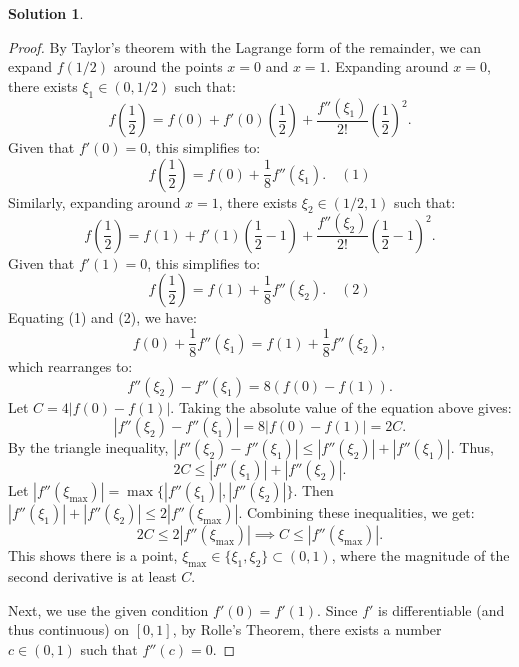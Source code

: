 \documentclass[12pt]{article}
\theoremstyle{definition}
\newtheorem*{solution}{\normalfont\textbf{Solution}}
\begin{document}
\begin{enumerate}[leftmargin=*]
\begin{solution}
\begin{proof}
            By Taylor's theorem with the Lagrange form of the remainder, we can expand \( f(1/2) \) around the points \( x=0 \) and \( x=1 \).
            Expanding around \( x=0 \), there exists \( \xi_1 \in (0, 1/2) \) such that:
            \[
            f\left(\frac{1}{2}\right) = f(0) + f'(0)\left(\frac{1}{2}\right) + \frac{f''(\xi_1)}{2!}\left(\frac{1}{2}\right)^2.
            \]
            Given that \( f'(0) = 0 \), this simplifies to:
            \[
            f\left(\frac{1}{2}\right) = f(0) + \frac{1}{8}f''(\xi_1). \quad (1)
            \]
            Similarly, expanding around \( x=1 \), there exists \( \xi_2 \in (1/2, 1) \) such that:
            \[
            f\left(\frac{1}{2}\right) = f(1) + f'(1)\left(\frac{1}{2} - 1\right) + \frac{f''(\xi_2)}{2!}\left(\frac{1}{2} - 1\right)^2.
            \]
            Given that \( f'(1) = 0 \), this simplifies to:
            \[
            f\left(\frac{1}{2}\right) = f(1) + \frac{1}{8}f''(\xi_2). \quad (2)
            \]
            Equating (1) and (2), we have:
            \[
            f(0) + \frac{1}{8}f''(\xi_1) = f(1) + \frac{1}{8}f''(\xi_2),
            \]
            which rearranges to:
            \[
            f''(\xi_2) - f''(\xi_1) = 8(f(0) - f(1)).
            \]
            Let \( C = 4|f(0) - f(1)| \). Taking the absolute value of the equation above gives:
            \[
            |f''(\xi_2) - f''(\xi_1)| = 8|f(0) - f(1)| = 2C.
            \]
            By the triangle inequality, \( |f''(\xi_2) - f''(\xi_1)| \le |f''(\xi_2)| + |f''(\xi_1)| \). Thus,
            \[
            2C \le |f''(\xi_1)| + |f''(\xi_2)|.
            \]
            Let \( |f''(\xi_{\text{max}})| = \max\{|f''(\xi_1)|, |f''(\xi_2)| \}\). Then \( |f''(\xi_1)| + |f''(\xi_2)| \le 2|f''(\xi_{\text{max}})| \). Combining these inequalities, we get:
            \[
            2C \le 2|f''(\xi_{\text{max}})| \implies C \le |f''(\xi_{\text{max}})|.
            \]
            This shows there is a point, \( \xi_{\text{max}} \in \{\xi_1, \xi_2\} \subset (0, 1) \), where the magnitude of the second derivative is at least \( C \).

            Next, we use the given condition \( f'(0) = f'(1) \). Since \( f' \) is differentiable (and thus continuous) on \( [0, 1] \), by Rolle's Theorem, there exists a number \( c \in (0, 1) \) such that \( f''(c) = 0 \).


\end{proof}
\end{solution}
\end{enumerate}
\end{document}
